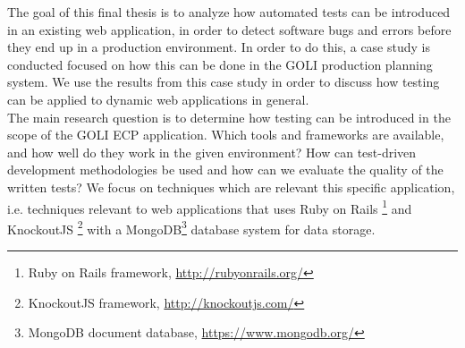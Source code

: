
The goal of this final thesis is to analyze how automated tests can be
introduced in an existing web application, in order to detect software
bugs and errors before they end up in a production environment. In order
to do this, a case study is conducted focused on how this can be done in
the GOLI production planning system. We use the results from this case
study in order to discuss how testing can be applied to dynamic web
applications in general.\\

The main research question is to determine how testing can be introduced
in the scope of the GOLI ECP application. Which tools and frameworks are
available, and how well do they work in the given environment? How can
test-driven development methodologies be used and how can we evaluate
the quality of the written tests? We focus on techniques which are
relevant this specific application, i.e. techniques relevant to web
applications that uses Ruby on Rails \footnote{Ruby on Rails framework,
\url{http://rubyonrails.org/}} and KnockoutJS \footnote{KnockoutJS
framework, \url{http://knockoutjs.com/}} with a MongoDB\footnote{MongoDB
document database, \url{https://www.mongodb.org/}} database system for
data storage.\\
